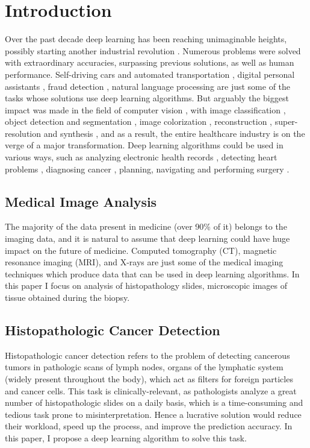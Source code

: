 \chapter{Introduction}
\label{ch:intro}

Over the past decade deep learning has been reaching unimaginable heights, possibly starting another industrial revolution \cite{ml_revolution}. Numerous problems were solved with extraordinary accuracies, surpassing previous solutions, as well as human performance. Self-driving cars \cite{bojarski2016end} and automated transportation \cite{nguyen2018deep}, digital personal assistants \cite{polyakov2018investigation}, fraud detection \cite{perols2011financial}, natural language processing \cite{young2018recent} are just some of the tasks whose solutions use deep learning algorithms. But arguably the biggest impact was made in the field of computer vision \cite{voulodimos2018deep}, with image classification \cite{rawat2017deep}, object detection  and segmentation \cite{zhao2019object}, image colorization \cite{zhang2016colorful}, reconstruction \cite{wang2018image}, super-resolution \cite{dong2014learning} and synthesis \cite{reed2016generative}, and as a result, the entire healthcare industry is on the verge of a major transformation. Deep learning algorithms could be used in various ways, such as analyzing electronic health records \cite{rajkomar2018scalable}, detecting heart problems \cite{poplin2018prediction}, diagnosing cancer \cite{fakoor2013using}, planning, navigating and performing surgery \cite{shvets2018automatic}.

\section{Medical Image Analysis}

The majority of the data present in medicine (over 90\% of it) belongs to the imaging data, and it is natural to assume that deep learning could have huge impact on the future of medicine. Computed tomography (CT), magnetic resonance imaging (MRI), and X-rays are just some of the medical imaging techniques which produce data that can be used in deep learning algorithms. In this paper I focus on analysis of histopathology slides, microscopic images of tissue obtained during the biopsy.

\section{Histopathologic Cancer Detection}
Histopathologic cancer detection refers to the problem of detecting cancerous tumors in pathologic scans of lymph nodes, organs of the lymphatic system (widely present throughout the body), which act as filters for foreign particles and cancer cells. This task is clinically-relevant, as pathologists analyze a great number of histopathologic slides on a daily basis, which is a time-consuming and tedious task prone to misinterpretation. Hence a lucrative solution would reduce their workload, speed up the process, and improve the prediction accuracy. In this paper, I propose a deep learning algorithm to solve this task.


